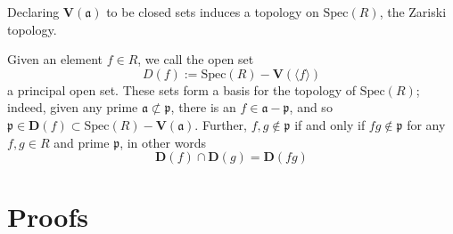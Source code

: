 \begin{defn}
    Declaring \(\mathbf{V}(\mathfrak{a})\) to be closed sets induces a topology on \(\mathrm{Spec}(R)\), the Zariski topology.

    Given an element \(f \in R\), we call the open set
    \begin{equation}
        D(f) := \mathrm{Spec}(R) - \mathbf{V}(\langle f \rangle)
    \end{equation}
    a principal open set. These sets form a basis for the topology of \(\mathrm{Spec}(R)\); indeed, given any prime \(\mathfrak{a} \not\subset \mathfrak{p}\), there is an \(f \in \mathfrak{a} - \mathfrak{p}\), and so \(\mathfrak{p} \in \mathbf{D}(f) \subset \mathrm{Spec}(R) - \mathbf{V}(\mathfrak{a})\). Further, \(f, g \not\in \mathfrak{p}\) if and only if \(fg \not\in \mathfrak{p}\) for any \(f, g \in R\) and prime \(\mathfrak{p}\), in other words
    \begin{equation}
        \mathbf{D}(f) \cap \mathbf{D}(g) = \mathbf{D}(fg)
    \end{equation}
\end{defn}

\section{Proofs}

